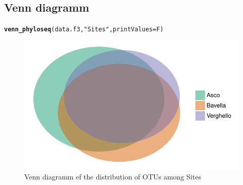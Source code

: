 \documentclass[12pt]{article}\usepackage[]{graphicx}\usepackage[]{color}
\makeatletter
\def\maxwidth{ %
  \ifdim\Gin@nat@width>\linewidth
    \linewidth
  \else
    \Gin@nat@width
  \fi
}
\newcommand{\hlstr}[1]{\textcolor[rgb]{0.192,0.494,0.8}{#1}}%
\newcommand{\hlstd}[1]{\textcolor[rgb]{0.345,0.345,0.345}{#1}}%
\newcommand{\hlkwc}[1]{\textcolor[rgb]{0.333,0.667,0.333}{#1}}%
\newcommand{\hlkwd}[1]{\textcolor[rgb]{0.737,0.353,0.396}{\textbf{#1}}}%
\newenvironment{kframe}{%
 \def\at@end@of@kframe{}%
 \ifinner\ifhmode%
  \def\at@end@of@kframe{\end{minipage}}%
  \begin{minipage}{\columnwidth}%
 \fi\fi%
 \def\FrameCommand##1{\hskip\@totalleftmargin \hskip-\fboxsep
 \colorbox{shadecolor}{##1}\hskip-\fboxsep
     \hskip-\linewidth \hskip-\@totalleftmargin \hskip\columnwidth}%
 \MakeFramed {\advance\hsize-\width
   \@totalleftmargin\z@ \linewidth\hsize
   \@setminipage}}%
 {\par\unskip\endMakeFramed%
 \at@end@of@kframe}
\newenvironment{knitrout}{}{} %
\numberwithin{figure}{section}
\makeatother
\begin{document}
  \subsection{Venn diagramm}
  
\begin{knitrout}\small
{}\color{fgcolor}\begin{kframe}
\begin{alltt}
\hlkwd{venn_phyloseq}\hlstd{(data.f3,} \hlstr{"Sites"}\hlstd{,} \hlkwc{printValues} \hlstd{= F)}
\end{alltt}
\end{kframe}\begin{figure}

{\centering \includegraphics[width=\maxwidth]{figure/unnamed-chunk-48-1} 

}

\caption[Venn diagramm ef the distribution of OTUs among Sites]{Venn diagramm ef the distribution of OTUs among Sites}\label{fig:unnamed-chunk-48}
\end{figure}


\end{knitrout}
\end{document}
